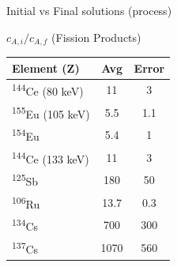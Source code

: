 \documentclass{beamer}
\newcommand{\tss}{\textsuperscript}
\begin{document}
\begin{frame}{\small Initial vs Final solutions (process)}
  \vspace{-0.6cm}
  \begin{block}{$c_{A,i}/c_{A,f}$ (Fission Products)}
    \begin{center}
      \vskip -0.2cm
  {\fontsize{7}{11.2}\selectfont
  \begin{tabular}{l  c  c }\toprule
   Element (Z)  & Avg & Error \\ \midrule 
   \tss{144}Ce (80 keV) & 11 & 3  \\
   \tss{155}Eu (105 keV) & 5.5 & 1.1   \\
   \tss{154}Eu & 5.4  & 1  \\
   \tss{144}Ce (133 keV) & 11 & 3  \\
   \tss{125}Sb & 180   & 50   \\
   \tss{106}Ru & 13.7   & 0.3   \\
   \tss{134}Cs & 700  & 300   \\
   \tss{137}Cs & 1070 & 560\\ \bottomrule
  \end{tabular}
  }
  \end{center}
  \end{block}
\end{frame}

\end{document}
